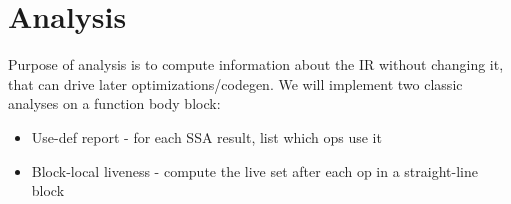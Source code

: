 \documentclass[../main.tex]{subfiles}
\begin{document}
\section{Analysis}
Purpose of analysis is to compute information about the IR without changing it,
that can drive later optimizations/codegen.
We will implement two classic analyses on a function body block:
\begin{itemize}
    \item Use-def report - for each SSA result, list which ops use it
\end{itemize}
\begin{itemize}
    \item Block-local liveness - compute the live set after each op in a straight-line block
\end{itemize}
\end{document}
